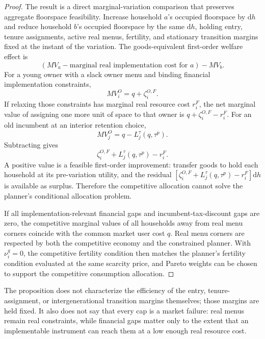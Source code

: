 \documentclass[11pt]{article}
\newcommand{\dd}{\mathrm d}
\newcommand{\1}{\mathbf 1}
\begin{document}
\begin{proof}
The result is a direct marginal-variation comparison that preserves aggregate floorspace feasibility. Increase household $a$'s occupied floorspace by $\dd h$ and reduce household $b$'s occupied floorspace by the same $\dd h$, holding entry, tenure assignments, active real menus, fertility, and stationary transition margins fixed at the instant of the variation. The goods-equivalent first-order welfare effect is
\[
\left(MV_a-\text{marginal real implementation cost for }a\right)-MV_b.
\]
For a young owner with a slack owner menu and binding financial implementation constraints,
\[
MV_i^O=q+\zeta_i^{O,F}.
\]
If relaxing those constraints has marginal real resource cost $r_i^F$, the net marginal value of assigning one more unit of space to that owner is $q+\zeta_i^{O,F}-r_i^F$. For an old incumbent at an interior retention choice,
\[
MV_j^O=q-L_j^\tau(q,\tau^p).
\]
Subtracting gives
\[
\zeta_i^{O,F}+L_j^\tau(q,\tau^p)-r_i^F.
\]
A positive value is a feasible first-order improvement: transfer goods to hold each household at its pre-variation utility, and the residual $\left[\zeta_i^{O,F}+L_j^\tau(q,\tau^p)-r_i^F\right]\dd h$ is available as surplus. Therefore the competitive allocation cannot solve the planner's conditional allocation problem.

If all implementation-relevant financial gaps and incumbent-tax-discount gaps are zero, the competitive marginal values of all households away from real menu corners coincide with the common market user cost $q$. Real menu corners are respected by both the competitive economy and the constrained planner. With $\nu_i^g=0$, the competitive fertility condition then matches the planner's fertility condition evaluated at the same scarcity price, and Pareto weights can be chosen to support the competitive consumption allocation.
\end{proof}

The proposition does not characterize the efficiency of the entry, tenure-assignment, or intergenerational transition margins themselves; those margins are held fixed. It also does not say that every cap is a market failure: real menus remain real constraints, while financial gaps matter only to the extent that an implementable instrument can reach them at a low enough real resource cost.
\end{document}
